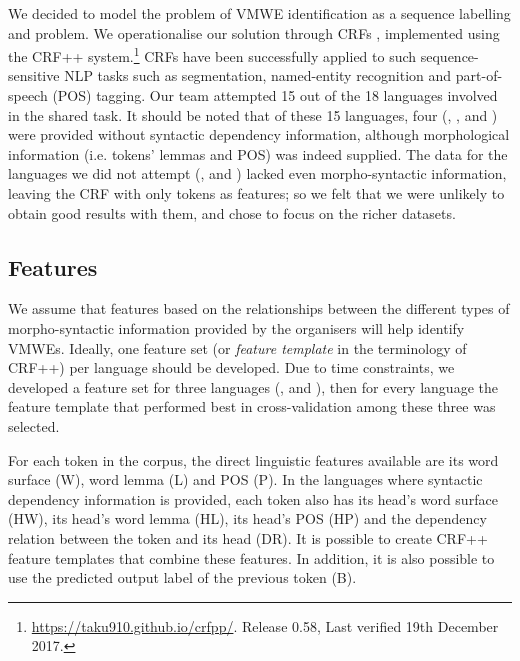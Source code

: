\documentclass[output=paper
,modfonts
,nonflat]{langsci/langscibook}
\begin{document}
We decided to model the problem of VMWE identification as a sequence
labelling and  problem. We operationalise our solution
through CRFs \citep{Lafferty2001}, implemented using the
CRF++ system.\footnote{\url{https://taku910.github.io/crfpp/}. Release 0.58, Last verified 19th December 2017.} CRFs have
been successfully applied to such sequence-sensitive NLP tasks such as
segmentation, named-entity
recognition \citep{han2013chinese,han2015chinese} and part-of-speech (POS)
tagging. Our team attempted 15 out of the 18 languages involved in the
shared task.  It should be noted that of these 15 languages, four
(, ,  and ) were provided without syntactic
dependency information, although morphological information
(i.e. tokens' lemmas and POS) was indeed supplied.
The data for the languages we did not attempt (,  and
) lacked even morpho-syntactic information, leaving the CRF
with only tokens as features; so we felt that we were unlikely to
obtain good results with them, and chose to focus on the richer
datasets. 



\subsection{Features}

We assume that features based on the relationships between the
different types of morpho-syntactic information provided by the
organisers will help identify VMWEs. Ideally, one feature set (or
\emph{feature template} in the terminology of CRF++) per language
should be developed. Due to time constraints, we developed a
feature set for three languages (,  and ), then for
every language the feature template that performed best in
cross-validation among these three was selected.

For each token in the corpus, the direct linguistic features available 
are its word surface (W), word lemma (L) and POS (P). In the languages
where syntactic dependency information is provided, each token also
has its head's word surface (HW), its head's word lemma (HL), its
head's POS (HP) and the dependency relation between the token and its
head (DR). It is possible to create CRF++ feature templates that
combine these features. In addition, it is also possible to use the
predicted output label of the previous token (B). 
\end{document}
